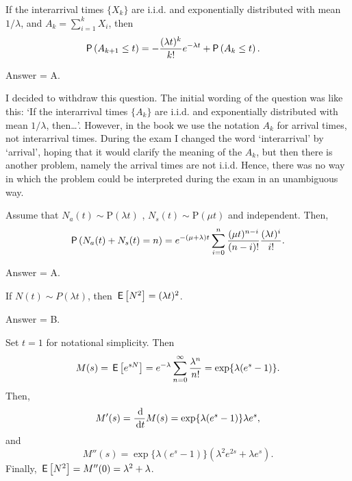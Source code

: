 \begin{exercise}[201703]
 If the interarrival times $\{X_k\}$ are i.i.d. and exponentially
 distributed with mean $1/\lambda$, and $A_k = \sum_{i=1}^k X_i$, then 
\begin{equation*}
 \begin{split}
\P{A_{k+1} \leq t} 
&= - \frac{(\lambda t)^{k}}{k!} e^{-\lambda t} + \P{A_k \leq t}.
 \end{split}
\end{equation*}
\begin{solution}
 Answer = A. 

 I decided to withdraw this question. The initial wording of the
 question was like this: `If the interarrival times $\{A_k\}$ are
 i.i.d. and exponentially distributed with mean $1/\lambda$,
 then\ldots'. However, in the book we use the notation $A_k$ for
 arrival times, not interarrival times. During the exam I changed
 the word `interarrival' by `arrival', hoping that it would clarify
 the meaning of the $A_k$, but then there is another problem,
 namely the arrival times are not i.i.d. Hence, there was no way
 in which the problem could be interpreted during the exam in an
 unambiguous way. 
\end{solution}
\end{exercise}

\begin{exercise}[201703] 
Assume that
 $N_a(t)\sim \text{P}(\lambda t)$ , $N_s(t) \sim \text{P}(\mu t)$ and
 independent. Then,
 \begin{equation*}
\P{N_a(t) + N_s(t) = n} 
= e^{-(\mu+\lambda)t} \sum_{i=0}^n \frac{(\mu t)^{n-i}}{(n-i)!} \frac{(\lambda t)^i}{i!}. \\
 \end{equation*}
\begin{solution}
 Answer = A.
\end{solution}
\end{exercise}


\begin{exercise}[201703]
 If $N(t)\sim P(\lambda t)$,
 then $\,\mathsf{E}\left[N^2\right]=(\lambda t)^2$.

\begin{solution}
Answer = B.

Set $t=1$ for notational simplicity. Then
\begin{equation*}
 M(s) = \,\mathsf{E}\left[e^{sN}\right] = e^{-\lambda}\sum_{n=0}^\infty \frac{\lambda^n}{n!} = \exp\{\lambda(e^s-1)\}.
\end{equation*}
Then, 
\begin{equation*}
 M'(s) = \frac{\d}{\d t} M(s) = \exp\{\lambda(e^s-1)\}\lambda e^s,
\end{equation*}
and 
\begin{equation*}
 M''(s) = \exp\{\lambda(e^s-1)\}(\lambda^2 e^{2s} + \lambda e^s).
\end{equation*}
Finally, 
$\,\mathsf{E}\left[N^2\right] = M''(0) = \lambda^2+\lambda$. 

\end{solution}
\end{exercise}


